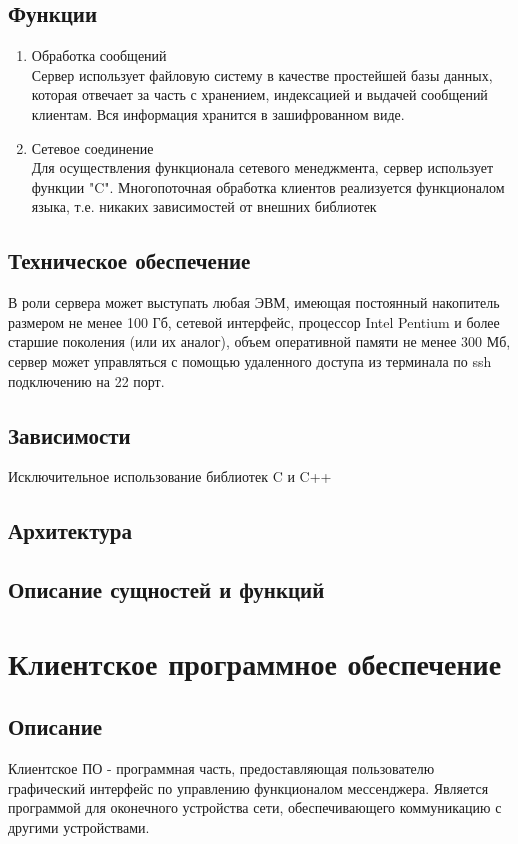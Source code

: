 \documentclass[a4paper,12pt]{article}
\begin{document}
\subsection{Функции}
\begin{enumerate}
    \item Обработка сообщений \\    
    Сервер использует файловую систему в качестве простейшей базы данных, которая отвечает за часть с хранением, индексацией и выдачей сообщений клиентам. Вся информация хранится в зашифрованном виде.

    \item Сетевое соединение \\
	Для осуществления функционала сетевого менеджмента, сервер использует функции "C". Многопоточная обработка клиентов реализуется функционалом языка, т.е. никаких зависимостей от внешних библиотек
\end{enumerate}

\subsection{Техническое обеспечение}
	В роли сервера может выступать любая ЭВМ, имеющая постоянный накопитель размером не менее 100 Гб, сетевой интерфейс, процессор Intel Pentium и более старшие поколения (или их аналог), объем оперативной памяти не менее 300 Мб, сервер может управляться с помощью удаленного доступа из терминала по ssh подключению на 22 порт.

\subsection{Зависимости}
    Исключительное использование библиотек C и C++

\subsection{Архитектура}


\subsection{Описание сущностей и функций}


\section{Клиентское программное обеспечение}
\subsection{Описание}
    Клиентское ПО - программная часть, предоставляющая пользователю графический интерфейс по управлению функционалом мессенджера. Является программой для оконечного устройства сети, обеспечивающего коммуникацию с другими устройствами. 
\end{document}
